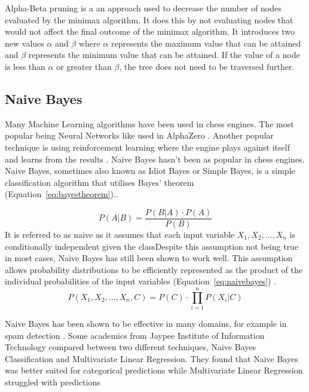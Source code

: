 \documentclass{article}
\begin{document}
Alpha-Beta pruning is a an approach used to decrease the number of nodes evaluated by the minimax algorithm.
It does this by not evaluating nodes that would not affect the final outcome of the minimax algorithm.
It introduces two new values $\alpha$ and $\beta$ where $\alpha$ represents the maximum value
that can be attained and $\beta$ represents the minimum value that can be attained. If the 
value of a node is less than $\alpha$ or greater than $\beta$, the tree does not need to be
traversed further.


\subsection{Naive Bayes}
\label{sec:naivebayes}
Many Machine Learning algorithms have been used in chess engines. The most popular being Neural Networks
like used in AlphaZero \cite{kleinNeuralNetworksChess2022}. Another popular technique is using reinforcement
learning where the engine plays against itself and learns from the results \cite{silverGeneralReinforcementLearning2018}.
Naive Bayes hasn't been as popular in chess engines. Naive Bayes, sometimes also known as Idiot Bayes or Simple Bayes,
is a simple classification algorithm that utilises Bayes' theorem (Equation~\ref{eq:bayestheorem}).\cite{lowdNaiveBayesModels2005}. 

\begin{equation}
    \label{eq:bayestheorem}
    P(A|B) = \frac{P(B|A) \cdot P(A)}{P(B)}
\end{equation}
It is referred to as naive as it assumes that each input variable $X_1, X_2,..., X_n $ is conditionally independent given the classDespite this assumption not being true in most cases, Naive Bayes has
still been shown to work well. This assumption allows probability distributions to be efficiently represented
as the product of the individual probabilities of the input variables (Equation~\ref{eq:naivebayes}) \cite{lowdNaiveBayesModels2005}.
\begin{equation}
\label{eq:naivebayes}
P(X_1, X_2, ..., X_n, C) ={P(C)}\cdot \prod_{i=1}^{n}{P(X_i | C)}
\end{equation}

Naive Bayes has been shown to be effective in many domains, for example in spam detection \cite{eberhardtBayesianSpamDetection2015}.
Some academics from Jaypee Institute of Information Technology compared between two different
techniques, Naive Bayes Classification and Multivariate Linear Regression. They found that Naive Bayes
was better suited for categorical predictions while Multivariate Linear Regression struggled with
predictions \cite{departmentofcomputerscienceandengineeringjaypeeinstituteofinformationtechnologynoida201304indiaStatisticalAnalysisResult2018}
\end{document}
